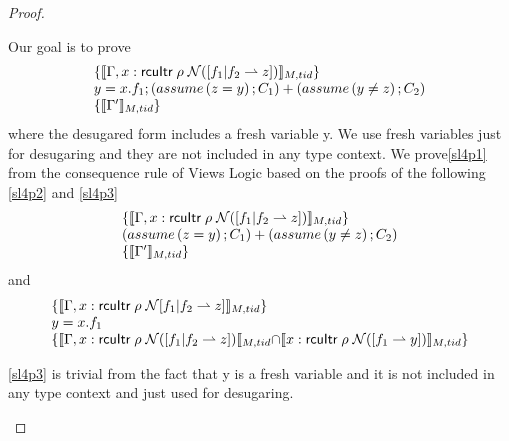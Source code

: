 \begin{proof}
\begin{case}
    Our goal is to prove
    \begin{gather}\label{sl4p1}
      \begin{array}{l}
      \{\llbracket \Gamma,x:\textsf{rcuItr}\;\rho\;\mathcal{N}([f_1 | f_2 \rightharpoonup z]) \rrbracket_{M,tid} \} \\
      y = x.f_1;\left(assume\left(z = y\right);C_1\right)+\left(assume\left(y \neq z\right);C_2 \right)\\
      \{\llbracket \Gamma' \rrbracket_{M,tid} \}
      \end{array}
    \end{gather}
    where the desugared form includes a fresh variable y. We use fresh variables just for desugaring and they are not included in any type context.
    We prove\ref{sl4p1} from the consequence rule  of Views Logic based on the proofs of the following \ref{sl4p2} and \ref{sl4p3}
    \begin{gather}\label{sl4p2}
      \begin{array}{l}
      \{\llbracket\Gamma,   x:\textsf{rcuItr}\;\rho\;\mathcal{N}([f_1 | f_2 \rightharpoonup z])\rrbracket_{M,tid}\} \\
      \left(assume\left(z = y\right);C_1\right)+\left(assume\left(y \neq z\right);C_2 \right) \\
      \{\llbracket \Gamma' \rrbracket_{M,tid}\}
      \end{array}
    \end{gather}
    and
    \begin{gather}\label{sl4p3}\begin{array}{l}
      \{\llbracket \Gamma,   x:\textsf{rcuItr}\;\rho\;\mathcal{N}[f_1 | f_2 \rightharpoonup z] \rrbracket_{M,tid}\} \\
      y = x.f_1\\
      \{\llbracket \Gamma,   x:\textsf{rcuItr}\;\rho\;\mathcal{N}([f_1 | f_2 \rightharpoonup z]) \llbracket_{M,tid} \cap \llbracket x:\textsf{rcuItr}\;\rho\;\mathcal{N}([f_1 \rightharpoonup y]) \rrbracket_{M,tid} \}
      \end{array}
      \end{gather}

    \ref{sl4p3} is trivial from the fact that y is a fresh variable and it is not included in any type context and just used for desugaring.


\end{case}
\end{proof}

